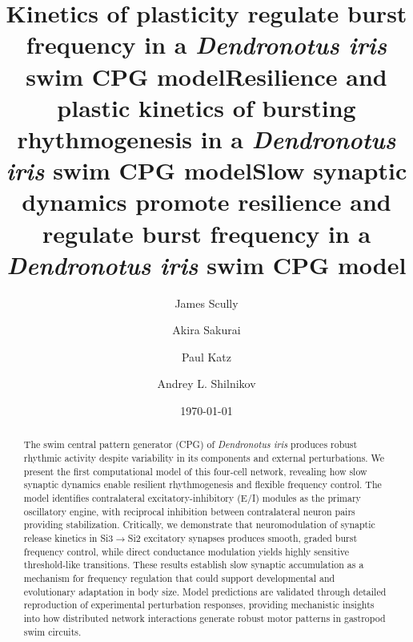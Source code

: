 \documentclass[nofootinbib,aip,amsmath,amssymb,preprint,twocolumn,floatfix,10pt]{revtex4-2}
\begin{document}
\title{Kinetics of plasticity regulate burst frequency in a {\em Dendronotus iris} swim CPG model}
\title{Resilience and plastic kinetics of bursting rhythmogenesis in a {\em Dendronotus iris} swim CPG model}
\title{Slow synaptic dynamics promote resilience and regulate burst frequency in a {\em Dendronotus iris} swim CPG model}

\author{James Scully}
\author{Akira Sakurai}
\author{Paul Katz}
\author{Andrey L. Shilnikov}


\date{\today}
\begin{abstract}

The swim central pattern generator (CPG) of {\em Dendronotus iris} produces robust rhythmic activity despite variability in its components and external perturbations.
We present the first computational model of this four-cell network, revealing how slow synaptic dynamics enable resilient rhythmogenesis and flexible frequency control.
The model identifies contralateral excitatory-inhibitory (E/I) modules as the primary oscillatory engine, with reciprocal inhibition between contralateral neuron pairs providing stabilization.
Critically, we demonstrate that neuromodulation of synaptic release kinetics in Si3$\to$Si2 excitatory synapses produces smooth, graded burst frequency control, while direct conductance modulation yields highly sensitive threshold-like transitions.
These results establish slow synaptic accumulation as a mechanism for frequency regulation that could support developmental and evolutionary adaptation in body size.
Model predictions are validated through detailed reproduction of experimental perturbation responses, providing mechanistic insights into how distributed network interactions generate robust motor patterns in gastropod swim circuits.
\end{abstract}
\end{document}
